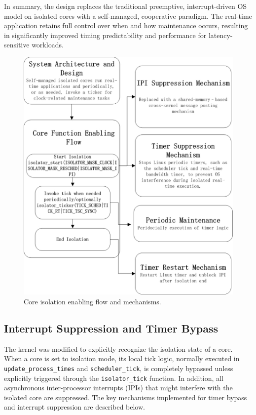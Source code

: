 \documentclass[letterpaper]{article}
\begin{document}
In summary, the design replaces the traditional preemptive, interrupt-driven OS model on isolated cores with a self-managed, cooperative paradigm. The real-time application retains full control over when and how maintenance occurs, resulting in significantly improved timing predictability and performance for latency-sensitive workloads.

\begin{figure}[htbp]
    \centering
    \includegraphics[width=0.9\linewidth]{Isolator.jpg}
    \caption{Core isolation enabling flow and mechanisms.}
    \label{fig:isolator_flow}
\end{figure}


\subsection{Interrupt Suppression and Timer Bypass}
\label{subsec:interrupt-timer}

The kernel was modified to explicitly recognize the isolation state of a core.
When a core is set to isolation mode, its local tick logic, normally executed in
\texttt{update\_process\_times} and \texttt{scheduler\_tick},
is completely bypassed unless explicitly triggered through the \texttt{isolator\_tick} function.
In addition, all asynchronous inter-processor interrupts (IPIs) that might interfere with the
isolated core are suppressed. The key mechanisms implemented for timer bypass and interrupt suppression are described below.
\end{document}

